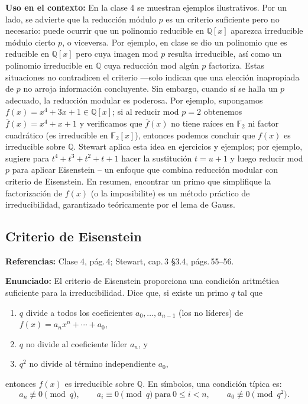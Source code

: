 \documentclass[12pt, letter]{article}
\begin{document}
\textbf{Uso en el contexto:}  
En la clase 4 se muestran ejemplos ilustrativos.  
Por un lado, se advierte que la reducción módulo $p$ es un criterio suficiente pero no necesario: puede ocurrir que un polinomio reducible en $\mathbb{Q}[x]$ aparezca irreducible módulo cierto $p$, o viceversa.  
Por ejemplo, en clase se dio un polinomio que es reducible en $\mathbb{Q}[x]$ pero cuya imagen mod $p$ resulta irreducible, así como un polinomio irreducible en $\mathbb{Q}$ cuya reducción mod algún $p$ factoriza.  
Estas situaciones no contradicen el criterio —solo indican que una elección inapropiada de $p$ no arroja información concluyente.  
Sin embargo, cuando sí se halla un $p$ adecuado, la reducción modular es poderosa.  
Por ejemplo, supongamos $f(x)=x^{4}+3x+1\in\mathbb{Q}[x]$; si al reducir mod $p=2$ obtenemos $\bar f(x)=x^{4}+x+1$ y verificamos que $\bar f(x)$ no tiene raíces en $\mathbb{F}_2$ ni factor cuadrático (es irreducible en $\mathbb{F}_2[x]$), entonces podemos concluir que $f(x)$ es irreducible sobre $\mathbb{Q}$.  
Stewart aplica esta idea en ejercicios y ejemplos; por ejemplo, sugiere para $t^{4}+t^{3}+t^{2}+t+1$ hacer la sustitución $t=u+1$ y luego reducir mod $p$ para aplicar Eisenstein – un enfoque que combina reducción modular con criterio de Eisenstein.  
En resumen, encontrar un primo que simplifique la factorización de $f(x)$ (o la imposibilite) es un método práctico de irreducibilidad, garantizado teóricamente por el lema de Gauss.

\subsection*{Criterio de Eisenstein}

\textbf{Referencias:} Clase 4, pág.\,4; Stewart, cap.\,3 §3.4, págs.\,55–56.

\textbf{Enunciado:}  
El criterio de Eisenstein proporciona una condición aritmética suficiente para la irreducibilidad.  
Dice que, si existe un primo $q$ tal que
\begin{enumerate}
  \item $q$ divide a todos los coeficientes $a_0,\dots,a_{n-1}$ (los no líderes) de $f(x)=a_nx^{n}+\cdots+a_0$,
  \item $q$ no divide al coeficiente líder $a_n$, y
  \item $q^{2}$ no divide al término independiente $a_0$,
\end{enumerate}
entonces $f(x)$ es irreducible sobre $\mathbb{Q}$.  
En símbolos, una condición típica es:
\[
  a_n \not\equiv 0 \pmod{q}, \qquad
  a_i \equiv 0 \pmod{q}\ \text{para}\ 0\le i<n, \qquad
  a_0 \not\equiv 0 \pmod{q^{2}}.
\]
\end{document}
